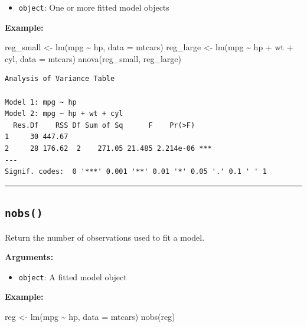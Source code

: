 \documentclass[
  letterpaper,
  DIV=11,
  numbers=noendperiod]{scrreprt}
\newenvironment{Shaded}{\begin{snugshade}}{\end{snugshade}}
\newcommand{\AttributeTok}[1]{\textcolor[rgb]{0.40,0.45,0.13}{#1}}
\newcommand{\FunctionTok}[1]{\textcolor[rgb]{0.28,0.35,0.67}{#1}}
\newcommand{\NormalTok}[1]{\textcolor[rgb]{0.00,0.23,0.31}{#1}}
\newcommand{\OtherTok}[1]{\textcolor[rgb]{0.00,0.23,0.31}{#1}}
\newcommand{\SpecialCharTok}[1]{\textcolor[rgb]{0.37,0.37,0.37}{#1}}
\providecommand{\tightlist}{%
  \setlength{\itemsep}{0pt}\setlength{\parskip}{0pt}}
\begin{document}
\begin{itemize}
\tightlist
\item
  \texttt{object}: One or more fitted model objects
\end{itemize}

\textbf{Example:}

\begin{Shaded}
\begin{Highlighting}[]
\NormalTok{reg\_small }\OtherTok{\textless{}{-}} \FunctionTok{lm}\NormalTok{(mpg }\SpecialCharTok{\textasciitilde{}}\NormalTok{ hp, }\AttributeTok{data =}\NormalTok{ mtcars)}
\NormalTok{reg\_large }\OtherTok{\textless{}{-}} \FunctionTok{lm}\NormalTok{(mpg }\SpecialCharTok{\textasciitilde{}}\NormalTok{ hp }\SpecialCharTok{+}\NormalTok{ wt }\SpecialCharTok{+}\NormalTok{ cyl, }\AttributeTok{data =}\NormalTok{ mtcars)}
\FunctionTok{anova}\NormalTok{(reg\_small, reg\_large)}
\end{Highlighting}
\end{Shaded}

\begin{verbatim}
Analysis of Variance Table

Model 1: mpg ~ hp
Model 2: mpg ~ hp + wt + cyl
  Res.Df    RSS Df Sum of Sq      F    Pr(>F)    
1     30 447.67                                  
2     28 176.62  2    271.05 21.485 2.214e-06 ***
---
Signif. codes:  0 '***' 0.001 '**' 0.01 '*' 0.05 '.' 0.1 ' ' 1
\end{verbatim}

\begin{center}\rule{0.5\linewidth}{0.5pt}\end{center}

\subsection{\texorpdfstring{\texttt{nobs()}}{nobs()}}\label{nobs}

Return the number of observations used to fit a model.

\textbf{Arguments:}

\begin{itemize}
\tightlist
\item
  \texttt{object}: A fitted model object
\end{itemize}

\textbf{Example:}

\begin{Shaded}
\begin{Highlighting}[]
\NormalTok{reg }\OtherTok{\textless{}{-}} \FunctionTok{lm}\NormalTok{(mpg }\SpecialCharTok{\textasciitilde{}}\NormalTok{ hp, }\AttributeTok{data =}\NormalTok{ mtcars)}
\FunctionTok{nobs}\NormalTok{(reg)}
\end{Highlighting}
\end{Shaded}
\end{document}
